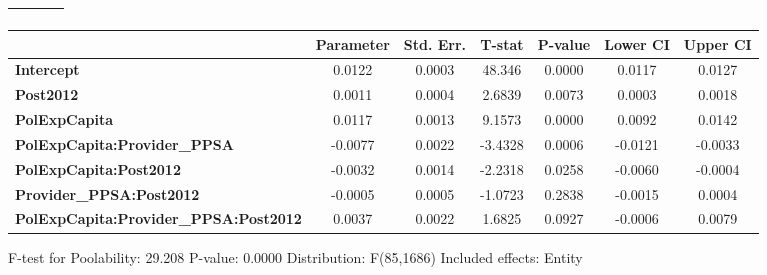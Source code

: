 \begin{center}
\begin{tabular}{lclc}
\textbf{}                                     &                    & \textbf{                     }   &                  \\
\bottomrule
\end{tabular}
\begin{tabular}{lcccccc}
                                              & \textbf{Parameter} & \textbf{Std. Err.} & \textbf{T-stat} & \textbf{P-value} & \textbf{Lower CI} & \textbf{Upper CI}  \\
\midrule
\textbf{Intercept}                            &       0.0122       &       0.0003       &      48.346     &      0.0000      &       0.0117      &       0.0127       \\
\textbf{Post2012}                             &       0.0011       &       0.0004       &      2.6839     &      0.0073      &       0.0003      &       0.0018       \\
\textbf{PolExpCapita}                         &       0.0117       &       0.0013       &      9.1573     &      0.0000      &       0.0092      &       0.0142       \\
\textbf{PolExpCapita:Provider\_PPSA}          &      -0.0077       &       0.0022       &     -3.4328     &      0.0006      &      -0.0121      &      -0.0033       \\
\textbf{PolExpCapita:Post2012}                &      -0.0032       &       0.0014       &     -2.2318     &      0.0258      &      -0.0060      &      -0.0004       \\
\textbf{Provider\_PPSA:Post2012}              &      -0.0005       &       0.0005       &     -1.0723     &      0.2838      &      -0.0015      &       0.0004       \\
\textbf{PolExpCapita:Provider\_PPSA:Post2012} &       0.0037       &       0.0022       &      1.6825     &      0.0927      &      -0.0006      &       0.0079       \\
\bottomrule
\end{tabular}
\end{center}

F-test for Poolability: 29.208 \newline
 P-value: 0.0000 \newline
 Distribution: F(85,1686) \newline
  \newline
 Included effects: Entity